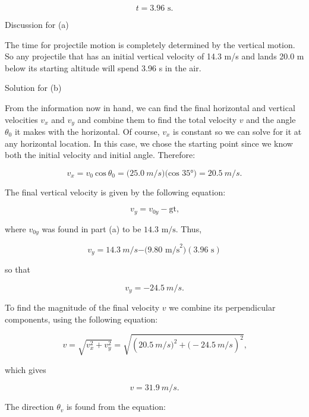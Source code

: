 \documentclass[
]{book}
\begin{document}
\leavevmode{}%
\[{{t = 3}\text{.}\text{96\ s}\text{.}}{}\]

{Discussion for (a)}

The time for projectile motion is completely determined by the vertical
motion. So any projectile that has an initial vertical velocity of 14.3
m/s and lands 20.0 m below its starting altitude will spend 3.96 s in
the air.

{Solution for (b)}

From the information now in hand, we can find the final horizontal and
vertical velocities \(v_{x}{}\) and \(v_{y}{}\) and combine them to find the
total velocity \(v{}\) and the angle \(\theta_{0}{}\) it makes with the
horizontal. Of course, \(v_{x}{}\) is constant so we can solve for it at
any horizontal location. In this case, we chose the starting point since
we know both the initial velocity and initial angle. Therefore:

\leavevmode{}%
\[{{v_{x} = v_{0}}\ \text{cos}\ {\theta_{0} = (}\text{25}\text{.}0\ m/s)(\text{cos\ 35°}{) = \text{20}}\text{.}5\ m/s.}{}\]

The final vertical velocity is given by the following equation:

\leavevmode{}%
\[{v_{y} = {v_{0y} - \text{gt,}}}{}\]

where \(v_{0y}{}\) was found in part (a) to be
\({\text{14}\text{.}\text{3~m/s}}{}\). Thus,

\leavevmode{}%
\[{{v_{y} = \text{14}}\text{.}3\ m/s{- (}9\text{.}\text{80\ m/s}^{2})(3\text{.}\text{96\ s})}{}\]

so that

\leavevmode{}%
\[{{v_{y} = {- \text{24}}}\text{.}5\ m/s.}{}\]

To find the magnitude of the final velocity \(v{}\) we combine its
perpendicular components, using the following equation:

\leavevmode{}%
\[{{v = \sqrt{v_{x}^{2} + v_{y}^{2}}} = \sqrt{(\text{20}\text{.}5\ m/s{{)^{2} + (} - \text{24}}\text{.}5\ m/s)^{2}}\text{,}}{}\]

which gives

\leavevmode{}%
\[{{v = \text{31}}\text{.}9\ m/s.}{}\]

The direction \(\theta_{v}{}\) is found from the equation:
\end{document}
